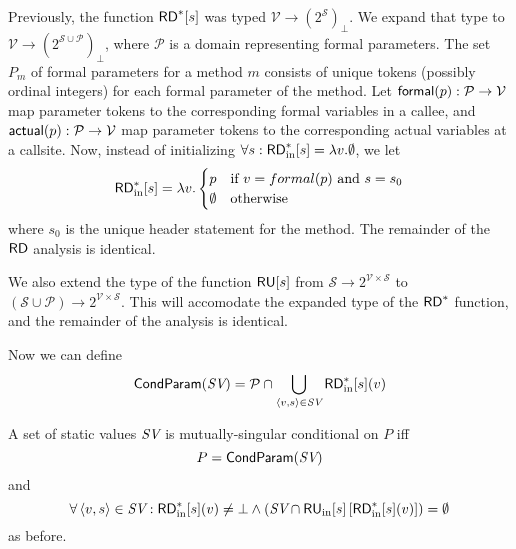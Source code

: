 \documentclass[11pt,notitlepage]{article}
\newcommand{\bigvar}[1]{\ensuremath{\text{\it #1}}}
\newcommand{\func}[1]{\ensuremath{\text{\sffamily #1}}}
\begin{document}
Previously, the function $\func{RD}^*[s]$ was typed
$\mathcal{V}\to(2^\mathcal{S})_\bot$.  We expand that type to
$\mathcal{V}\to(2^{\mathcal{S}\cup\mathcal{P}})_\bot$, where
$\mathcal{P}$ is a domain
representing formal parameters.  The set $P_m$ of formal parameters for
a method $m$ consists of unique tokens (possibly ordinal integers) for
each formal parameter of the method.  Let
$\func{formal}(p):\mathcal{P\to V}$ map parameter tokens to the
corresponding formal variables in a callee, and
$\func{actual}(p):\mathcal{P\to V}$ map parameter tokens to the
corresponding actual variables at a callsite.
Now, instead of initializing $\forall s :
\func{RD}^*_\text{in}[s]=\lambda v.\emptyset$, we let
\begin{displaymath}
\func{RD}^*_\text{in}[s]=\lambda v.\begin{cases}
p & \text{if }v=formal(p)\text{ and }s=s_0\\
\emptyset & \text{otherwise} \\
\end{cases}
\end{displaymath}
where $s_0$ is the unique header statement for the method.
The remainder of the $\func{RD}$ analysis is identical.

We also extend the type of the function $\func{RU}[s]$ from
$\mathcal{S}\to 2^\mathcal{V\times S}$ to
$(\mathcal{S}\cup\mathcal{P})\to 2^\mathcal{V\times S}$.
This will accomodate the expanded type of the $\func{RD}^*$ function,
and the remainder of the analysis is identical.

Now we can define
\begin{displaymath}
\func{CondParam}(\bigvar{SV}) = \mathcal{P} \cap
    \bigcup_{\tuple{v,s}\in\bigvar{SV}} \func{RD}^*_\text{in}[s](v)
\end{displaymath}

A set of static values $\bigvar{SV}$ is
mutually-singular conditional on $P$ iff
$$P=\func{CondParam}(\bigvar{SV})$$ and
\begin{displaymath}
  \forall \tuple{v,s}\in \bigvar{SV} : \func{RD}^*_\text{in}[s](v) \neq \bot
  \wedge 
  \left(\bigvar{SV}\cap\func{RU}_\text{in}[s]\left[\func{RD}^*_\text{in}[s](v)\right]\right) = \emptyset
\end{displaymath}
as before.
\end{document}
